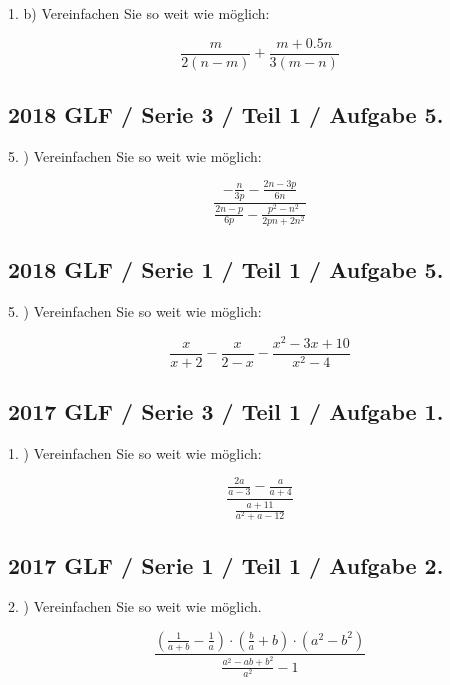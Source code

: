 {1. b) Vereinfachen Sie so weit wie möglich:

$$\frac{m}{2(n-m)} + \frac{m+0.5n}{3(m-n)}$$



\subsection*{2018 GLF / Serie 3 / Teil 1 / Aufgabe 5.}

5. ) Vereinfachen Sie so weit wie möglich:

$$\frac{- \frac{n}{3p} - \frac{2n-3p}{6n}}{\frac{2n-p}{6p} - \frac{p^2-n^2}{2pn+2n^2}}$$


\subsection*{2018 GLF / Serie 1 / Teil 1 / Aufgabe 5.}

5. ) Vereinfachen Sie so weit wie möglich:

$$\frac{x}{x+2} - \frac{x}{2-x} - \frac{x^2-3x+10}{x^2-4}  $$

\subsection*{2017 GLF / Serie 3 / Teil 1 / Aufgabe 1.}

1. ) Vereinfachen Sie so weit wie möglich:

$$\frac{\frac{2a}{a-3}-\frac{a}{a+4}}{\frac{a+11}{a^2+a-12}}$$

\subsection*{2017 GLF / Serie 1 / Teil 1 / Aufgabe 2.}

2. ) Vereinfachen Sie so weit wie möglich.

$$\frac{\left(\frac1{a+b} - \frac1a \right) \cdot{} \left(\frac{b}a + b\right) \cdot{} \left(a^2-b^2\right)}{\frac{a^2-ab+b^2}{a^2}-1}$$

}
